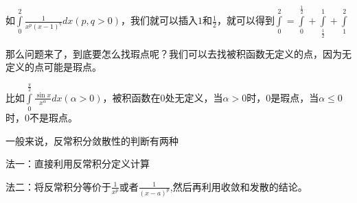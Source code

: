 \documentclass[lang=cn,10pt]{elegantbook}
\begin{document}
如$\int\limits_0^2{\frac{1}{x^p\left( x-1 \right) ^q}dx\left( p,q>0 \right)}$，我们就可以插入$1$和$\frac{1}{2}$，就可以得到$\int\limits_0^2{=}\int\limits_0^{\frac{1}{2}}{}+\int\limits_{\frac{1}{2}}^1{}+\int\limits_1^2{}$

那么问题来了，到底要怎么找瑕点呢？我们可以去找被积函数无定义的点，因为无定义的点可能是瑕点。

比如$\int\limits_0^{\frac{\pi}{2}}{\frac{\sin x}{x^{\alpha}}dx\left( \alpha >0 \right)}$，被积函数在$0$处无定义，当$\alpha>0$时，$0$是瑕点，当$\alpha\le0$时，0不是瑕点。

一般来说，反常积分敛散性的判断有两种

法一：直接利用反常积分定义计算

法二：将反常积分等价于$\frac{1}{x^{p}}$或者$\frac{1}{(x-a)^{p}}$,然后再利用收敛和发散的结论。
\end{document}

